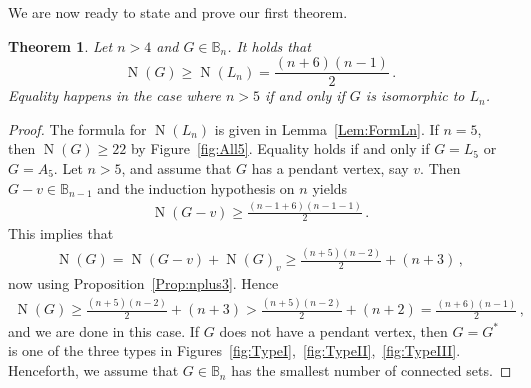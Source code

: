 \documentclass[a4paper,12pt]{amsart}
\newtheorem{theorem}[lemma]{Theorem}
\theoremstyle{remark}
\DeclareMathOperator{\N}{N}
\begin{document}
\medskip
We are now ready to state and prove our first theorem.

\begin{theorem}
Let $n>4$ and $G\in \mathbb{B}_n$. It holds that
$$\N(G) \geq \N(L_n)=\frac{(n+6)(n-1)}{2}
\,.$$ Equality happens in the case where $n>5$ if and only if $G$ is isomorphic to $L_n$. 
\end{theorem}

\begin{proof}
The formula for $\N(L_n)$ is given in Lemma~\ref{Lem:FormLn}. If $n=5$, then $\N(G) \geq 22$ by Figure~\ref{fig:All5}. Equality holds if and only if $G=L_5$ or $G=A_5$. Let $n>5$, and assume that $G$ has a pendant vertex, say $v$. Then $G-v \in \mathbb{B}_{n-1}$ and the induction hypothesis on $n$ yields
\begin{align*}
\N(G-v) \geq \frac{(n-1+6)(n-1-1)}{2}\,.
\end{align*}
This implies that
\begin{align*}
\N(G)=\N(G-v)+\N(G)_v \geq \frac{(n+5)(n-2)}{2}+ (n+3)\,,
\end{align*}
now using Proposition~\ref{Prop:nplus3}. Hence
\begin{align*}
\N(G)\geq \frac{(n+5)(n-2)}{2}+ (n+3) > \frac{(n+5)(n-2)}{2}+ (n+2)=\frac{(n+6)(n-1)}{2}\,,
\end{align*}
and we are done in this case. If $G$ does not have a pendant vertex, then $G=G^*$ is one of the three types in Figures~\ref{fig:TypeI},~\ref{fig:TypeII},~\ref{fig:TypeIII}. Henceforth, we assume that $G\in \mathbb{B}_n$ has the smallest number of connected sets. 


\end{proof}
\end{document}
